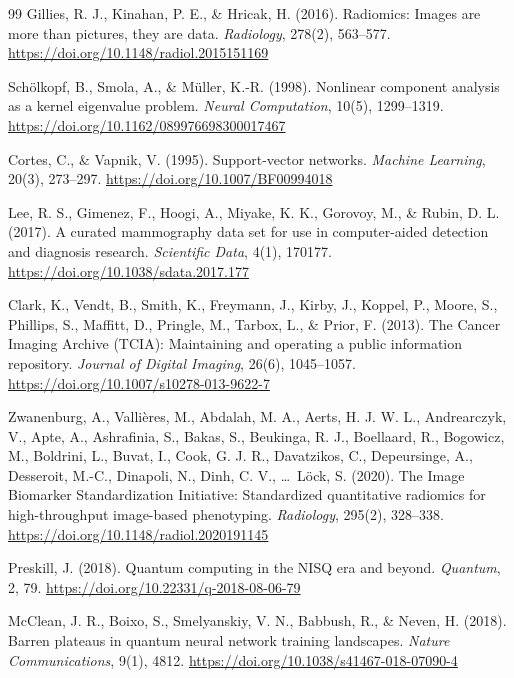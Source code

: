 \begin{thebibliography}{99}
    Gillies, R. J., Kinahan, P. E., \& Hricak, H. (2016).
    Radiomics: Images are more than pictures, they are data.
    \textit{Radiology}, 278(2), 563--577.
    \url{https://doi.org/10.1148/radiol.2015151169}

    Sch{\"o}lkopf, B., Smola, A., \& M{\"u}ller, K.-R. (1998).
    Nonlinear component analysis as a kernel eigenvalue problem.
    \textit{Neural Computation}, 10(5), 1299--1319.
    \url{https://doi.org/10.1162/089976698300017467}

    Cortes, C., \& Vapnik, V. (1995).
    Support-vector networks.
    \textit{Machine Learning}, 20(3), 273--297.
    \url{https://doi.org/10.1007/BF00994018}

    Lee, R. S., Gimenez, F., Hoogi, A., Miyake, K. K., Gorovoy, M., \& Rubin, D. L. (2017).
    A curated mammography data set for use in computer-aided detection and diagnosis research.
    \textit{Scientific Data}, 4(1), 170177.
    \url{https://doi.org/10.1038/sdata.2017.177}

    Clark, K., Vendt, B., Smith, K., Freymann, J., Kirby, J., Koppel, P., Moore, S., Phillips, S., Maffitt, D., Pringle, M., Tarbox, L., \& Prior, F. (2013).
    The Cancer Imaging Archive (TCIA): Maintaining and operating a public information repository.
    \textit{Journal of Digital Imaging}, 26(6), 1045--1057.
    \url{https://doi.org/10.1007/s10278-013-9622-7}

    Zwanenburg, A., Valli\`eres, M., Abdalah, M. A., Aerts, H. J. W. L., Andrearczyk, V., Apte, A., Ashrafinia, S., Bakas, S., Beukinga, R. J., Boellaard, R., Bogowicz, M., Boldrini, L., Buvat, I., Cook, G. J. R., Davatzikos, C., Depeursinge, A., Desseroit, M.-C., Dinapoli, N., Dinh, C. V., \ldots\ L\"ock, S. (2020).
    The Image Biomarker Standardization Initiative: Standardized quantitative radiomics for high-throughput image-based phenotyping.
    \textit{Radiology}, 295(2), 328--338.
    \url{https://doi.org/10.1148/radiol.2020191145}

    Preskill, J. (2018).
    Quantum computing in the NISQ era and beyond.
    \textit{Quantum}, 2, 79.
    \url{https://doi.org/10.22331/q-2018-08-06-79}

    McClean, J. R., Boixo, S., Smelyanskiy, V. N., Babbush, R., \& Neven, H. (2018).
    Barren plateaus in quantum neural network training landscapes.
    \textit{Nature Communications}, 9(1), 4812.
    \url{https://doi.org/10.1038/s41467-018-07090-4}


\end{thebibliography}

